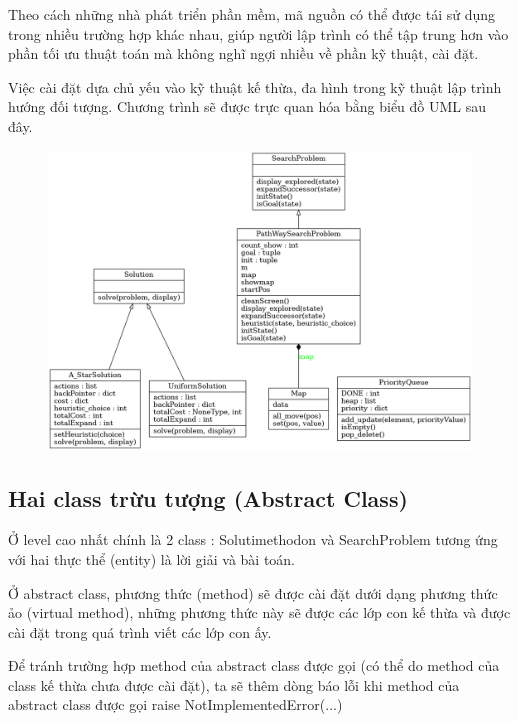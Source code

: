\documentclass[11pt]{scrartcl} %
\begin{document}
Theo cách những nhà phát triển phần mềm, mã nguồn có thể được tái sử dụng trong nhiều trường hợp khác nhau, giúp người lập trình có thể tập trung hơn vào phần tối ưu thuật toán mà không nghĩ ngợi nhiều về phần kỹ thuật, cài đặt.

Việc cài đặt dựa chủ yếu vào kỹ thuật kế thừa, đa hình trong kỹ thuật lập trình hướng đối tượng. Chương trình sẽ được trực quan hóa bằng biểu đồ UML sau đây.

\newpage
\begin{figure}[h] %
	\centering
	\includegraphics[width=1.2\columnwidth]{classes_uml_diagram.png} %
\end{figure}

\subsection{Hai class trừu tượng (Abstract Class)}
Ở level cao nhất chính là 2 class : Solutimethodon và SearchProblem tương ứng với hai thực thể (entity) là lời giải và bài toán.

Ở abstract class, phương thức (method) sẽ được cài đặt dưới dạng phương thức ảo (virtual method), những phương thức này sẽ được các lớp con kế thừa và được cài đặt trong quá trình viết các lớp con ấy.

Để tránh trường hợp method của abstract class được gọi (có thể do method của class kế thừa chưa được cài đặt), ta sẽ thêm dòng báo lỗi khi method của abstract class được gọi raise NotImplementedError(...)


\end{document}
